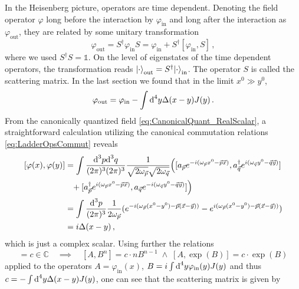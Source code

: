 In the Heisenberg picture, operators are time dependent. Denoting the field operator $\varphi$ long before the interaction by $\varphi_{\text{in}}$ and long after the interaction as $\varphi_{\text{out}}$, they are related by some unitary transformation
\begin{equation}
    \varphi_{\text{out}}=S^\dagger \varphi_{\text{in}}S=\varphi_{\text{in}}+S^\dagger[\varphi_{\text{in}},S]\,,
\end{equation}
where we used ${S^\dagger S=\mathbb{1}}$. On the level of eigenstates of the time dependent operators, the transformation reads ${{\lvert\cdot\rangle}_{\text{out}}=S^\dagger{\lvert\cdot\rangle}_{\text{in}}}$. The operator $S$ is called the scattering matrix. In the last section we found that in the limit ${x^0\gg y^0}$,
\begin{equation}
    \varphi_{\text{out}}=\varphi_{\text{in}}-\int\text{d}^4y\Delta(x-y)J(y)\,.
\end{equation}
From the canonically quantized field \eqref{eq:CanonicalQuant_RealScalar}, a straightforward calculation utilizing the canonical commutation relations \eqref{eq:LadderOpsCommut} reveals
\begin{subequations}
    \begin{align}
        [\varphi(x),\varphi(y)]&=\int\frac{\text{d}^3p\text{d}^3q}{(2\pi)^3(2\pi)^3}\frac{1}{\sqrt{2\omega_{\vec{p}}}\sqrt{2\omega_{\vec{q}}}}\Big([a_{\vec{p}}e^{-{i}(\omega_{\vec{p}}x^0-\vec{p}\vec{x})},a_{\vec{q}}^\dagger e^{{i}(\omega_{\vec{q}}y^0-\vec{q}\vec{y})}]\\
        &\phantom{=}+[a_{\vec{p}}^\dagger e^{{i}(\omega_{\vec{p}}x^0-\vec{p}\vec{x})},a_{\vec{q}} e^{-{i}(\omega_{\vec{q}}y^0-\vec{q}\vec{y})}]\Big)\\
        &=\int\frac{\text{d}^3p}{(2\pi)^3}\frac{1}{2\omega_{\vec{p}}}(e^{-{i}(\omega_{\vec{p}}(x^0-y^0)-\vec{p}(\vec{x}-\vec{y}))}-e^{{i}(\omega_{\vec{p}}(x^0-y^0)-\vec{p}(\vec{x}-\vec{y}))})\\
        &={i}\Delta(x-y)\,,
    \end{align}
\end{subequations}
which is just a complex scalar. Using further the relations
\begin{equation}
    [A,B]=c\in\mathbb{C}\quad\implies\quad[A,B^n]=c\cdot nB^{n-1}\;\wedge\;[A,\exp(B)]=c\cdot\exp(B)
\end{equation}
applied to the operators ${A=\varphi_{\text{in}}(x)}$, ${B={i}\int\text{d}^4y\varphi_{\text{in}}(y)J(y)}$ and thus ${c=-\int\text{d}^4y\Delta(x-y)J(y)}$, one can see that the scattering matrix is given by
